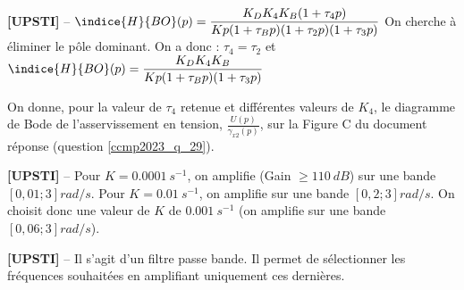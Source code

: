 \ifprof
\begin{corrige}%
\textbf{[UPSTI]} -- 
$\indice{H}{BO} (p)=\dfrac{K_D K_4 K_B (1+\tau_4 p)}{Kp(1+\tau_B p)(1+\tau_2 p)(1+\tau_3 p)}$
On cherche à éliminer le pôle dominant. On a donc : $\tau_4=\tau_2$ et  
$\indice{H}{BO} (p)=\dfrac{K_D K_4 K_B}{Kp(1+\tau_B p)(1+\tau_3 p)}$

\end{corrige}
\else
\fi

On donne, pour la valeur de $\tau_{4}$ retenue et différentes valeurs de $K_{4}$, le diagramme de Bode de l'asservissement en tension, $\frac{U(p)}{\gamma_{x 2}(p)}$, sur la Figure C du document réponse (question \ref{ccmp2023_q_29}).

\ifprof
\begin{corrige}%
\textbf{[UPSTI]} --
Pour $K = \SI{0,0001}{s^{-1}}$, on amplifie (Gain $\geq \SI{110}{dB}$) sur une bande $\left[0,01 ; 3\right] \si{rad/s}$.
Pour $K = \SI{0,01}{s^{-1}}$, on amplifie sur une bande $\left[0,2 ; 3\right] \si{rad/s}$.
On choisit donc une valeur de $K$ de $\SI{0,001}{s^{-1}}$ (on amplifie sur une bande $\left[0,06 ; 3\right] \si{rad/s}$).

\end{corrige}
\else
\fi

\ifprof
\begin{corrige}%
\textbf{[UPSTI]} -- 
Il s’agit d’un filtre passe bande. Il permet de sélectionner les fréquences souhaitées en amplifiant uniquement ces dernières.
\end{corrige}
\else
\fi
